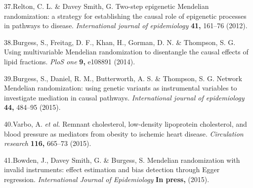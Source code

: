 \documentclass[]{article}
\begin{document}
37.Relton, C. L. \& {Davey Smith}, G. Two-step epigenetic Mendelian
randomization: a strategy for establishing the causal role of epigenetic
processes in pathways to disease. \emph{International journal of
epidemiology} \textbf{41,} 161--76 (2012).

38.Burgess, S., Freitag, D. F., Khan, H., Gorman, D. N. \& Thompson, S.
G. Using multivariable Mendelian randomization to disentangle the causal
effects of lipid fractions. \emph{PloS one} \textbf{9,} e108891 (2014).

39.Burgess, S., Daniel, R. M., Butterworth, A. S. \& Thompson, S. G.
Network Mendelian randomization: using genetic variants as instrumental
variables to investigate mediation in causal pathways.
\emph{International journal of epidemiology} \textbf{44,} 484--95
(2015).

40.Varbo, A. \emph{et al.} Remnant cholesterol, low-density lipoprotein
cholesterol, and blood pressure as mediators from obesity to ischemic
heart disease. \emph{Circulation research} \textbf{116,} 665--73 (2015).

41.Bowden, J., {Davey Smith}, G. \& Burgess, S. Mendelian randomization
with invalid instruments: effect estimation and bias detection through
Egger regression. \emph{International Journal of Epidemiology}
\textbf{In press,} (2015).
\end{document}

